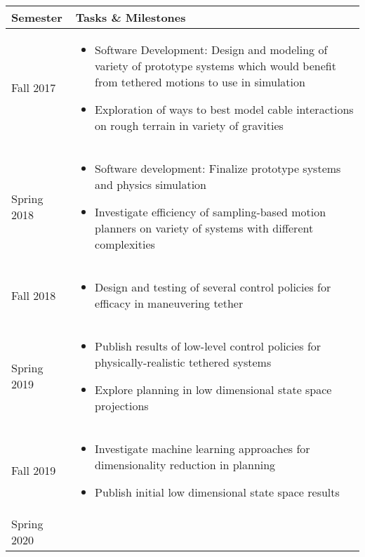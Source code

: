 \documentclass[12pt]{article}
\begin{document}
\newpage
\vspace{2cm}
\begin{center}
    \begin{tabular}{ | p{3cm} | p{11cm} |}
    \hline
    Semester & Tasks \& Milestones \\ \hline
    \vspace{0.2in}
    Fall 2017 & 
    \vspace{0.2in}
    \begin{itemize}
    	\item Software Development: Design and modeling of variety of prototype systems which would benefit from tethered motions to use in simulation
    	\item Exploration of ways to best model cable interactions on rough terrain in variety of gravities 
	\end{itemize}\\
	    Spring 2018 & 
    \begin{itemize}
    	\item Software development: Finalize prototype systems and physics simulation
    	\item Investigate efficiency of sampling-based motion planners on variety of systems with different complexities
	\end{itemize}\\
	    Fall 2018 & 
    \begin{itemize}
    	\item Design and testing of several control policies for efficacy in maneuvering tether
	\end{itemize}\\
	    Spring 2019 & 
    \begin{itemize}
    	\item Publish results of low-level control policies for physically-realistic tethered systems 
    	\item Explore planning in low dimensional state space projections
	\end{itemize}\\
	    Fall 2019 & 
    \begin{itemize}
    	\item Investigate machine learning approaches for dimensionality reduction in planning
    	\item Publish initial low dimensional state space results
	\end{itemize}\\
	    Spring 2020 & 
    \begin{itemize}

\end{itemize}
\end{tabular}
\end{center}
\end{document}
